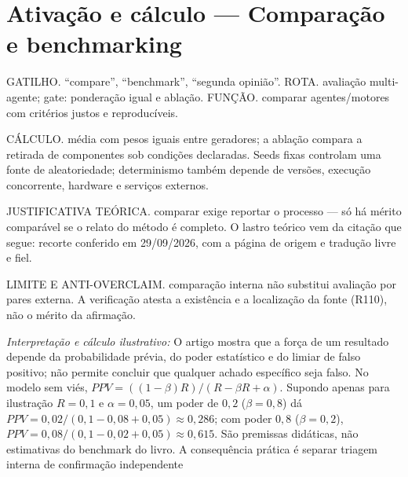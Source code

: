 \section[Ativação e cálculo]{Ativação e cálculo — Comparação e benchmarking}

\begin{processo}
GATILHO. ``compare'', ``benchmark'', ``segunda opinião''.
ROTA. avaliação multi-agente; gate: ponderação igual e ablação.
FUNÇÃO. comparar agentes/motores com critérios justos e reproducíveis.
\end{processo}

\begin{resultado}
CÁLCULO. média com pesos iguais entre geradores; a ablação compara a retirada de componentes sob condições declaradas. Seeds fixas controlam uma fonte de aleatoriedade; determinismo também depende de versões, execução concorrente, hardware e serviços externos.
\end{resultado}

\begin{descricao}
JUSTIFICATIVA TEÓRICA. comparar exige reportar o processo — só há mérito comparável se o relato do método é completo. O lastro teórico vem da citação que segue: recorte conferido em 29/09/2026, com a página de origem e tradução livre e fiel.
\end{descricao}

\begin{aviso}
LIMITE E ANTI-OVERCLAIM. comparação interna não substitui avaliação por pares externa. A verificação atesta a existência e a
localização da fonte (R110), não o mérito da afirmação.
\end{aviso}

\noindent\textit{Interpretação e cálculo ilustrativo:} O artigo mostra que a força de um resultado depende da probabilidade prévia, do poder estatístico e do limiar de falso positivo; não permite concluir que qualquer achado específico seja falso. No modelo sem viés, $PPV=((1-\beta)R)/(R-\beta R+\alpha)$. Supondo apenas para ilustração $R=0{,}1$ e $\alpha=0{,}05$, um poder de $0{,}2$ ($\beta=0{,}8$) dá $PPV=0{,}02/(0{,}1-0{,}08+0{,}05)\approx0{,}286$; com poder $0{,}8$ ($\beta=0{,}2$), $PPV=0{,}08/(0{,}1-0{,}02+0{,}05)\approx0{,}615$. São premissas didáticas, não estimativas do benchmark do livro. A consequência prática é separar triagem interna de confirmação independente 


